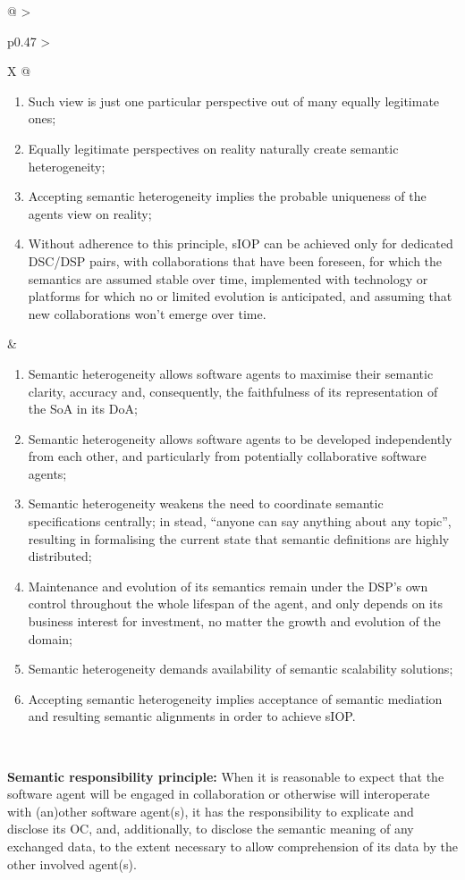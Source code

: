 \begin{xltabular}[l]{\linewidth}{@{} >{\small\raggedright\arraybackslash}p{0.47\linewidth} >{\small\raggedright\arraybackslash}X @{}}
\begin{enumerate}[left=6pt, nosep]
  \item Such view is just one particular perspective out of many equally legitimate ones;
  \item Equally legitimate perspectives on reality naturally create semantic heterogeneity;
  \item Accepting semantic heterogeneity implies the probable uniqueness of the agents view on reality;
  \item Without adherence to this principle, sIOP can be achieved only for dedicated DSC/DSP pairs, with collaborations that have been foreseen, for which the semantics are assumed stable over time, implemented with technology or platforms for which no or limited evolution is anticipated, and assuming that new collaborations won't emerge over time.
\end{enumerate}
&
\begin{enumerate}[left=10pt, nosep]
  \item Semantic heterogeneity allows software agents to maximise their semantic clarity, accuracy and, consequently, the faithfulness of its representation of the SoA in its DoA;
  \item Semantic heterogeneity allows software agents to be developed independently from each other, and particularly from potentially collaborative software agents;
  \item Semantic heterogeneity weakens the need to coordinate semantic specifications centrally; in stead, “anyone can say anything about any topic”, resulting in formalising the current state that semantic definitions are highly distributed;
  \item Maintenance and evolution of its semantics remain under the DSP’s own control throughout the whole lifespan of the agent, and only depends on its business interest for investment, no matter the growth and evolution of the domain;
  \item Semantic heterogeneity demands availability of semantic scalability solutions;
  \item Accepting semantic heterogeneity implies acceptance of semantic mediation and resulting semantic alignments in order to achieve sIOP.
\end{enumerate} \\
%
%
%
\begin{mmdp}\label{dp:srp}{\bfseries Semantic responsibility principle:}
\quad When it is reasonable to expect that the software agent will be engaged in collaboration or otherwise will interoperate with (an)other software agent(s), it has the responsibility to explicate and disclose its OC, and, additionally, to disclose the semantic meaning of any exchanged data, to the extent necessary to allow comprehension of its data by the other involved agent(s). 

\end{mmdp}
\end{xltabular}
